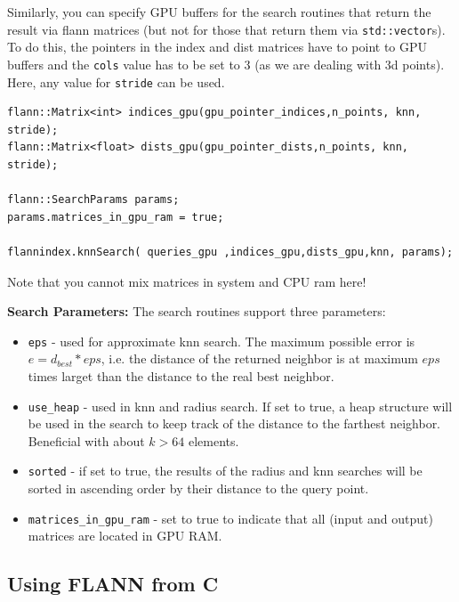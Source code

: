 \documentclass[letter,10pt]{article}
\begin{document}
Similarly, you can specify GPU buffers for the search routines that return the result via flann matrices (but not for those that return them via \texttt{std::vector}s).
To do this, the pointers in the index and dist matrices have to point to GPU buffers and the \texttt{cols} value has to be set to 3 (as we are dealing with 3d points). Here, any value for \texttt{stride} can be used.
\begin{Verbatim}[fontsize=\footnotesize,frame=single]
flann::Matrix<int> indices_gpu(gpu_pointer_indices,n_points, knn, stride);
flann::Matrix<float> dists_gpu(gpu_pointer_dists,n_points, knn, stride);

flann::SearchParams params;
params.matrices_in_gpu_ram = true;

flannindex.knnSearch( queries_gpu ,indices_gpu,dists_gpu,knn, params);
\end{Verbatim}
\begin{description}
 \item Note that you cannot mix matrices in system and CPU ram here!
\end{description}

\textbf{Search Parameters:}
The search routines support three parameters:
\begin{itemize}
 \item \texttt{eps} - used for approximate knn search. The maximum possible error is $e= d_{best} * eps$, i.e. the distance of the returned neighbor is at maximum $eps$ times larget than the distance to the real best neighbor.
 \item \texttt{use\_heap} - used in knn and radius search. If set to true, a heap structure will be used in the search to keep track of the distance to the farthest neighbor. Beneficial with about $k>64$ elements.
 \item \texttt{sorted} - if set to true, the results of the radius and knn searches will be sorted in ascending order by their distance to the query point.
 \item \texttt{matrices\_in\_gpu\_ram} - set to true to indicate that all (input and output) matrices are located in GPU RAM.
\end{itemize}


\subsection{Using FLANN from C}
\end{document}
